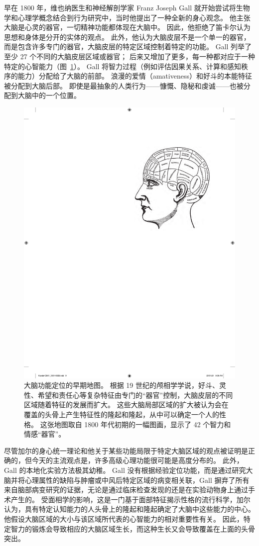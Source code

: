 早在 1800 年，维也纳医生和神经解剖学家 Franz Joseph Gall 就开始尝试将生物学和心理学概念结合到行为研究中，当时他提出了一种全新的身心观念。
他主张大脑是心灵的器官，一切精神功能都体现在大脑中。
因此，他拒绝了笛卡尔认为思想和身体是分开的实体的观点。
此外，他认为大脑皮层不是一个单一的器官，而是包含许多专门的器官，大脑皮层的特定区域控制着特定的功能。 
Gall 列举了至少 27 个不同的大脑皮层区域或器官； 后来又增加了更多，每一种都对应于一种特定的心智能力（图~\ref{fig:1_1}）。
Gall 将智力过程（例如评估因果关系、计算和感知秩序的能力）分配给了大脑的前部。
浪漫的爱情（amativeness）和好斗的本能特征被分配到大脑后部。
即使是最抽象的人类行为——慷慨、隐秘和虔诚——也被分配到大脑中的一个位置。


\begin{figure}[htbp]
	\centering
	\includegraphics[width=0.5\linewidth]{chap01/fig_1_1}
	\caption{大脑功能定位的早期地图。
		根据 19 世纪的颅相学学说，好斗、灵性、希望和责任心等复杂特征由专门的“器官”控制，大脑皮层的不同区域随着特征的发展而扩大。
		这些大脑局部区域的扩大被认为会在覆盖的头骨上产生特征性的隆起和隆起，从中可以确定一个人的性格。
		这张地图取自 1800 年代初期的一幅图画，显示了 42 个智力和情感“器官”。}
	\label{fig:1_1}
\end{figure}


尽管加尔的身心统一理论和他关于某些功能局限于特定大脑区域的观点被证明是正确的，但今天的主流观点是，许多高级心理功能很可能是高度分布的。
此外，Gall 的本地化实验方法极其幼稚。
Gall 没有根据经验定位功能，而是通过研究大脑并将心理属性的缺陷与肿瘤或中风后特定区域的病变相关联，Gall 摒弃了所有来自脑部病变研究的证据，无论是通过临床检查发现的还是在实验动物身上通过手术产生的。
受面相学的影响，这是一门基于面部特征揭示性格的流行科学，加尔认为，具有特定认知能力的人头骨上的隆起和隆起确定了大脑中这些能力的中心。
他假设大脑区域的大小与该区域所代表的心智能力的相对重要性有关。
因此，特定智力的锻炼会导致相应的大脑区域生长，而这种生长又会导致覆盖在上面的头骨突出。


